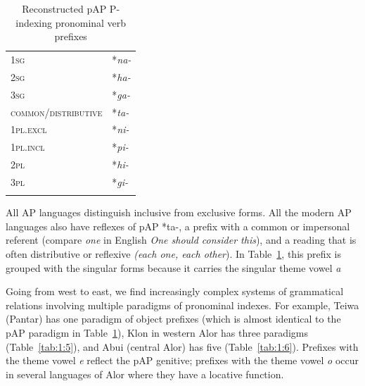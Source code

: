 \begin{table}[b]

\begin{tabularx}{.5\textwidth}{lX}
\lsptoprule
{\scshape 1sg} & *\textit{na-}\\
{\scshape 2sg} & *\textit{ha-}\\
{\scshape 3sg} & *\textit{ga-}\\
{\scshape common/distributive} & *\textit{ta-}\\
{\scshape 1pl.excl} & *\textit{ni-}  \\
{\scshape 1pl.incl} & *\textit{pi-}\\
{\scshape 2pl} & *\textit{hi-}\\
{\scshape 3pl} & *\textit{gi-}\\
\lspbottomrule
\end{tabularx}
\caption{Reconstructed pAP P-indexing pronominal verb prefixes }
\label{tab:1:4}
\end{table}

All AP languages distinguish inclusive from exclusive forms. All the modern AP languages also have reflexes of pAP *ta-, a prefix with a common or impersonal referent (compare \textit{one} in English \textit{One should consider this}), and a reading that is often distributive or reflexive \textit{(each one, each other}). In Table~\ref{tab:1:4}, this prefix is grouped with the singular forms because it carries the singular theme vowel \textit{a}

Going from west to east, we find increasingly complex systems of grammatical relations involving multiple paradigms of pronominal indexes. For example, Teiwa (Pantar) has one paradigm of object prefixes (which is almost identical to the pAP paradigm in Table~\ref{tab:1:4}), Klon in western Alor has three paradigms (Table~\ref{tab:1:5}), and Abui (central Alor) has five (Table~\ref{tab:1:6}). Prefixes with the theme vowel \textit{e} reflect the pAP genitive;  prefixes with the theme vowel \textit{o} occur in several languages of Alor where they have a locative function.



